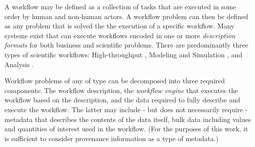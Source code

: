 A workflow may be defined as a collection of tasks that are executed in some
order by human and non-human actors. A workflow problem can then be defined as
any problem that is solved the the execution of a specific workflow. Many
systems exist that can execute workflows encoded in one or more
\textit{description formats} for both business and scientific problems. There
are predominantly three types of scientific workflows: High-throughput \cite{},
Modeling and Simulation \cite{}, and Analysis \cite{}.

Workflow problems of any of type can be decomposed into three required
components: The workflow description, the \textit{workflow engine} that
executes the workflow based on the description, and the data required to fully
describe and execute the workflow. The latter may include - but does not
necessarily require - metadata that describes the contents of the data itself,
bulk data including values and quantities of interest used in the workflow.
(For the purposes of this work, it is sufficient to consider provenance
information as a type of metadata.)